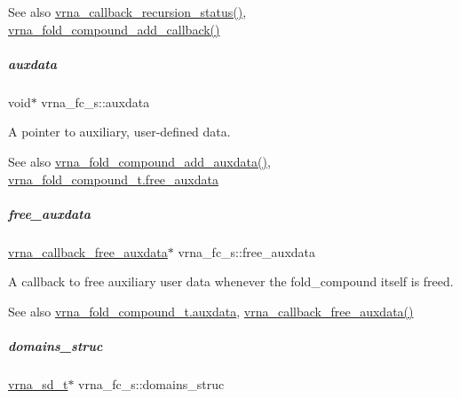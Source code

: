 \begin{DoxySeeAlso}{See also}
\mbox{\hyperlink{group__fold__compound_gac86036fa8cad1108832335063243cdc8}{vrna\+\_\+callback\+\_\+recursion\+\_\+status()}}, \mbox{\hyperlink{group__fold__compound_ga097ed6133055624667cbce8cfdebf82d}{vrna\+\_\+fold\+\_\+compound\+\_\+add\+\_\+callback()}} 
\end{DoxySeeAlso}
\mbox{\label{group__fold__compound_a20048e0c369e9f24b55423d600037c68}} 
\subparagraph{\texorpdfstring{auxdata}{auxdata}}
{\footnotesize\ttfamily void$\ast$ vrna\+\_\+fc\+\_\+s\+::auxdata}



A pointer to auxiliary, user-\/defined data. 

\begin{DoxySeeAlso}{See also}
\mbox{\hyperlink{group__fold__compound_ga6316a9426bea2f742375e8df6febd3f6}{vrna\+\_\+fold\+\_\+compound\+\_\+add\+\_\+auxdata()}}, \mbox{\hyperlink{group__fold__compound_a8e84dbabab016ecd74da6c38cb94e816}{vrna\+\_\+fold\+\_\+compound\+\_\+t.\+free\+\_\+auxdata}} 
\end{DoxySeeAlso}
\mbox{\label{group__fold__compound_a8e84dbabab016ecd74da6c38cb94e816}} 
\subparagraph{\texorpdfstring{free\+\_\+auxdata}{free\_auxdata}}
{\footnotesize\ttfamily \mbox{\hyperlink{group__fold__compound_ga7806651f51b195013839a218b3bbd5a3}{vrna\+\_\+callback\+\_\+free\+\_\+auxdata}}$\ast$ vrna\+\_\+fc\+\_\+s\+::free\+\_\+auxdata}



A callback to free auxiliary user data whenever the fold\+\_\+compound itself is free\textquotesingle{}d. 

\begin{DoxySeeAlso}{See also}
\mbox{\hyperlink{group__fold__compound_a20048e0c369e9f24b55423d600037c68}{vrna\+\_\+fold\+\_\+compound\+\_\+t.\+auxdata}}, \mbox{\hyperlink{group__fold__compound_ga7806651f51b195013839a218b3bbd5a3}{vrna\+\_\+callback\+\_\+free\+\_\+auxdata()}} 
\end{DoxySeeAlso}
\mbox{\label{group__fold__compound_ac25a84f2658de0d7a54cd710c16198b1}} 
\subparagraph{\texorpdfstring{domains\+\_\+struc}{domains\_struc}}
{\footnotesize\ttfamily \mbox{\hyperlink{structured__domains_8h_afa7bbdebb6be4a0d8b829208d4083383}{vrna\+\_\+sd\+\_\+t}}$\ast$ vrna\+\_\+fc\+\_\+s\+::domains\+\_\+struc}



